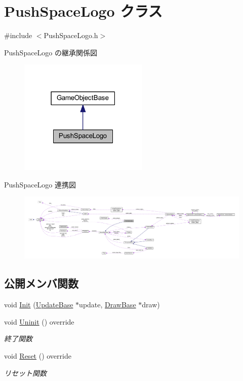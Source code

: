 \hypertarget{class_push_space_logo}{}\section{Push\+Space\+Logo クラス}
\label{class_push_space_logo}


{\ttfamily \#include $<$Push\+Space\+Logo.\+h$>$}



Push\+Space\+Logo の継承関係図\nopagebreak
\begin{figure}[H]
\begin{center}
\leavevmode
\includegraphics[width=174pt]{class_push_space_logo__inherit__graph}
\end{center}
\end{figure}


Push\+Space\+Logo 連携図\nopagebreak
\begin{figure}[H]
\begin{center}
\leavevmode
\includegraphics[width=350pt]{class_push_space_logo__coll__graph}
\end{center}
\end{figure}
\subsection*{公開メンバ関数}
\begin{DoxyCompactItemize}
\item 
void \mbox{\hyperlink{class_push_space_logo_a381d34d0dfdd493eb46f299d2a2ba858}{Init}} (\mbox{\hyperlink{class_update_base}{Update\+Base}} $\ast$update, \mbox{\hyperlink{class_draw_base}{Draw\+Base}} $\ast$draw)
\item 
void \mbox{\hyperlink{class_push_space_logo_a06404113db417c58941ca7a13bba161e}{Uninit}} () override
\begin{DoxyCompactList}\small\item\em 終了関数 \end{DoxyCompactList}\item 
void \mbox{\hyperlink{class_push_space_logo_afa163b1aff8df494b4f09f378bf983f0}{Reset}} () override
\begin{DoxyCompactList}\small\item\em リセット関数 \end{DoxyCompactList}\end{DoxyCompactItemize}

